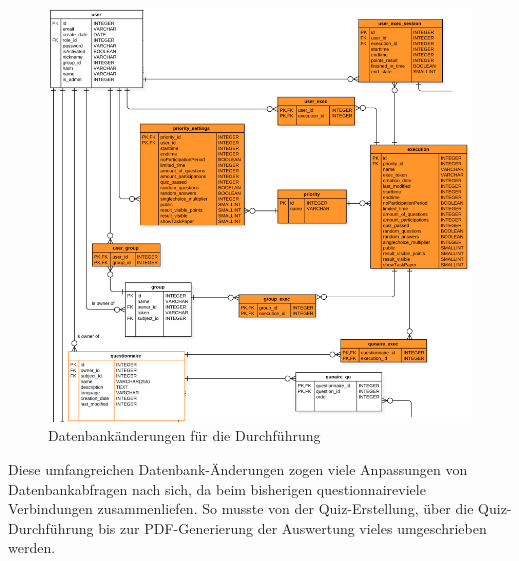 \begin{itemize}
	\begin{figure}[H]
		\centering
		\includegraphics[width=1\textwidth
		]{Images/DB_Execution_Table.PNG}
		\caption{Datenbankänderungen für die Durchführung}
	\end{figure}
	
\end{itemize}

Diese umfangreichen Datenbank-Änderungen zogen viele Anpassungen von Datenbankabfragen nach sich, da beim bisherigen \glqq questionnaire\grqq viele Verbindungen zusammenliefen. So musste von der Quiz-Erstellung, über die Quiz-Durchführung bis zur PDF-Generierung der Auswertung vieles umgeschrieben werden.
